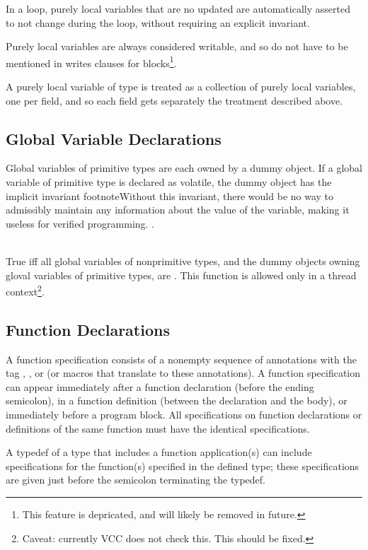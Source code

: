 \documentclass[preprint,nocopyrightspace]{sigplanconf}
\begin{document}
{{{\begin{VCC}
In a loop, purely local variables that are no updated are
automatically asserted to not change during the loop, without
requiring an explicit invariant.

Purely local variables are always considered writable, and so do not
have to be mentioned in writes clauses for blocks\footnote{This
feature is depricated, and will likely be removed in future.}. 


A purely local variable of  type is treated
as a collection of purely local variables, one per field, and so each
field gets separately the treatment described above.

\subsection{Global Variable Declarations}
Global variables of primitive types are each owned by a dummy
object. If a global variable  of primitive type is declared as
volatile, the dummy object has the implicit invariant
footnote{Without this invariant, there would be no way to admissibly
maintain any information about the value of the variable, making it
useless for verified programming.
}.

\\
True iff all global variables of nonprimitive types, and the dummy
objects owning gloval variables of primitive types,
are \vcc{\mutable}. This function is allowed only in a thread
context\footnote{
Caveat: currently VCC does not check this. This should be fixed.
}.


\subsection{Function Declarations}
A function specification consists of a nonempty sequence of
annotations with the tag , ,
or  (or macros that translate to these annotations). A
function specification can appear immediately after a function
declaration (before the ending semicolon), in a function definition
(between the declaration and the body), or immediately before a
program block. All specifications on function declarations or
definitions of the same function must have the identical
specifications.

A typedef of a type that includes a function application(s) can include
specifications for the function(s) specified in the defined type;
these specifications are given just before the semicolon terminating
the typedef.


\end{VCC}}}}
\end{document}
